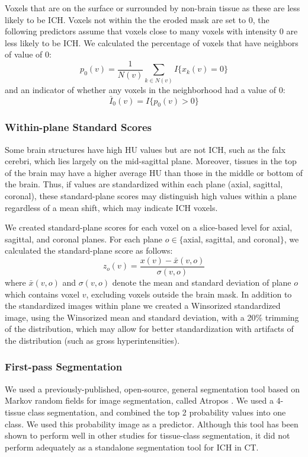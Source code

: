 \documentclass{elsarticle_nonatbib}\usepackage[]{graphicx}\usepackage[]{color}
\begin{document}
Voxels that are on the surface or surrounded by non-brain tissue as these are less likely to be ICH.  Voxels not within the the eroded mask are set to $0$, the following predictors assume that voxels close to many voxels with intensity $0$ are less likely to be ICH.    
We calculated the percentage of voxels that have neighbors of value of $0$:
\begin{equation}
p_{0}(v) = \frac{1}{N(v)} \sum_{k \in N(v)} I\{ x_k(v) = 0 \} \label{eq:pct0}
\end{equation}
and an indicator of whether any voxels in the neighborhood had a value of $0$:
\begin{equation}
\bar{I}_{0}(v) = I\{ p_{0}(v) > 0 \} \label{eq:I0}
\end{equation}
 
\subsubsection{Within-plane Standard Scores} Some brain structures have high HU values but are not ICH, such as the falx cerebri, which lies largely on the mid-sagittal plane.  Moreover, tissues in the top of the brain may have a higher average HU than those in the middle or bottom of the brain.  Thus, if values are standardized within each plane (axial, sagittal, coronal), these standard-plane scores may distinguish high values within a plane regardless of a mean shift, which may indicate ICH voxels.

We created standard-plane scores for each voxel on a slice-based level for axial, sagittal, and coronal planes. For each plane $o \in \{$axial, sagittal, and coronal$\}$, we calculated the standard-plane score as follows: 
\begin{equation}
z_{o}(v) = \frac{x(v) - \bar{x}(v, o)}{\sigma(v, o)} \label{eq:z}
\end{equation}
where $\bar{x}(v, o)$ and $\sigma(v, o)$ denote the mean and standard deviation of plane $o$ which contains voxel $v$, excluding voxels outside the brain mask.   In addition to the standardized images within plane we created a Winsorized standardized image, using the Winsorized mean and standard deviation, with a 20\% trimming of the distribution, which may allow for better standardization with artifacts of the distribution (such as gross hyperintensities). 

\subsubsection{First-pass Segmentation} We used a previously-published, open-source, general segmentation tool based on Markov random fields for image segmentation, called Atropos \citep{atropos}.  We used a 4-tissue class segmentation, and combined the top 2 probability values into one class.  We used this probability image as a predictor.  Although this tool has been shown to perform well in other studies for tissue-class segmentation, it did not perform adequately as a standalone segmentation tool for ICH in CT.  
\end{document}
